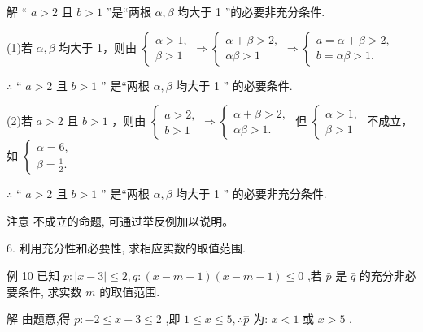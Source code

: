 \documentclass[10pt]{article}
\begin{document}
解 “ \(a > 2\) 且 \(b > 1\) ”是“两根 \(\alpha ,\beta\) 均大于 1 ”的必要非充分条件.

(1)若 \(\alpha ,\beta\) 均大于 1，则由 \(\left\{  {\begin{array}{l} \alpha  > 1, \\  \beta  > 1 \end{array} \Rightarrow  \left\{  {\begin{array}{l} \alpha  + \beta  > 2, \\  {\alpha \beta } > 1 \end{array} \Rightarrow  \left\{  \begin{array}{l} a = \alpha  + \beta  > 2, \\  b = {\alpha \beta } > 1. \end{array}\right. }\right. }\right.\)

\(\therefore\) “ \(a > 2\) 且 \(b > 1\) ” 是“两根 \(\alpha ,\beta\) 均大于 1 ” 的必要条件.

(2)若 \(a > 2\) 且 \(b > 1\) ，则由 \(\left\{  {\begin{array}{l} a > 2, \\  b > 1 \end{array} \Rightarrow  \left\{  \begin{array}{l} \alpha  + \beta  > 2, \\  {\alpha \beta } > 1. \end{array}\right. }\right.\) 但 \(\left\{  \begin{array}{l} \alpha  > 1, \\  \beta  > 1 \end{array}\right.\) 不成立，如 \(\left\{  \begin{array}{l} \alpha  = 6, \\  \beta  = \frac{1}{2}. \end{array}\right.\)

\(\therefore\) “ \(a > 2\) 且 \(b > 1\) ” 是“两根 \(\alpha ,\beta\) 均大于 1 ” 的必要非充分条件.

注意 不成立的命题, 可通过举反例加以说明。

6. 利用充分性和必要性, 求相应实数的取值范围.

例 10 已知 \(p : \left| {x - 3}\right|  \leq  2,q : \left( {x - m + 1}\right) \left( {x - m - 1}\right)  \leq  0\) ,若 \(\bar{p}\) 是 \(\bar{q}\) 的充分非必要条件, 求实数 \(m\) 的取值范围.

解 由题意,得 \(p :  - 2 \leq  x - 3 \leq  2\) ,即 \(1 \leq  x \leq  5,\therefore \overset{ - }{p}\) 为: \(x < 1\) 或 \(x > 5\) .
\end{document}
